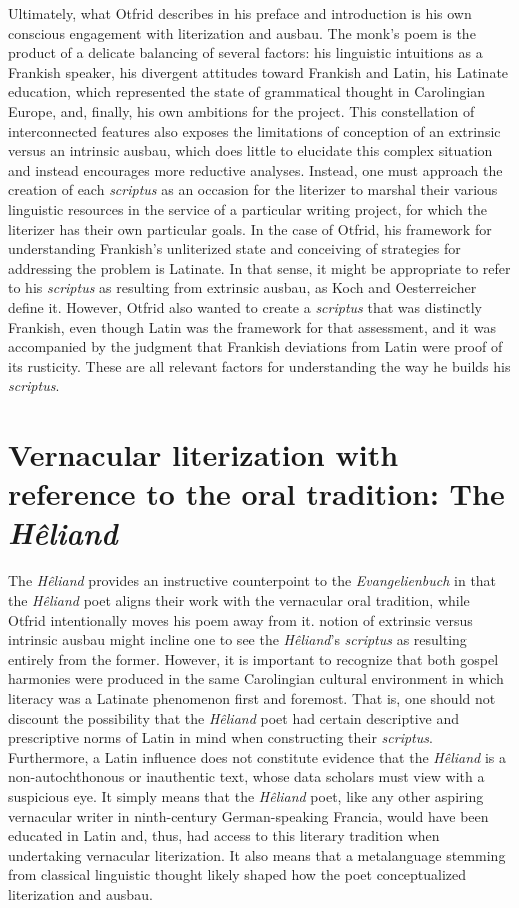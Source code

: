 Ultimately, what Otfrid describes in his preface and introduction is his own conscious engagement with literization and ausbau. The monk’s poem is the product of a delicate balancing of several factors: his linguistic intuitions as a Frankish speaker, his divergent attitudes toward Frankish and Latin, his Latinate education, which represented the state of grammatical thought in Carolingian Europe, and, finally, his own ambitions for the project. This constellation of interconnected features also exposes the limitations of  conception of an extrinsic versus an intrinsic ausbau, which does little to elucidate this complex situation and instead encourages more reductive analyses. Instead, one must approach the creation of each \textit{scriptus} as an occasion for the literizer to marshal their various linguistic resources in the service of a particular writing project, for which the literizer has their own particular goals. In the case of Otfrid, his framework for understanding Frankish’s unliterized state and conceiving of strategies for addressing the problem is Latinate. In that sense, it might be appropriate to refer to his \textit{scriptus} as resulting from extrinsic ausbau, as Koch and Oesterreicher define it. However, Otfrid also wanted to create a \textit{scriptus} that was distinctly Frankish, even though Latin was the framework for that assessment, and it was accompanied by the judgment that Frankish deviations from Latin were proof of its rusticity. These are all relevant factors for understanding the way he builds his \textit{scriptus}.

\section{Vernacular literization with reference to the oral tradition: The \textit{Hêliand}}\label{sec:5.3}

The \textit{Hêliand} provides an instructive counterpoint to the \textit{Evangelienbuch} in that the \textit{Hêliand} poet aligns their work with the vernacular oral tradition, while Otfrid intentionally moves his poem away from it.  notion of extrinsic versus intrinsic ausbau might incline one to see the \textit{Hêliand}’s \textit{scriptus} as resulting entirely from the former. However, it is important to recognize that both gospel harmonies were produced in the same Carolingian cultural environment in which literacy was a Latinate phenomenon first and foremost. That is, one should not discount the possibility that the \textit{Hêliand} poet had certain descriptive and prescriptive norms of Latin in mind when constructing their \textit{scriptus}. Furthermore, a Latin influence does not constitute evidence that the \textit{Hêliand} is a non-autochthonous or inauthentic text, whose data scholars must view with a suspicious eye. It simply means that the \textit{Hêliand} poet, like any other aspiring vernacular writer in ninth-century German-speaking Francia, would have been educated in Latin and, thus, had access to this literary tradition when undertaking vernacular literization. It also means that a metalanguage stemming from classical linguistic thought likely shaped how the poet conceptualized literization and ausbau.

